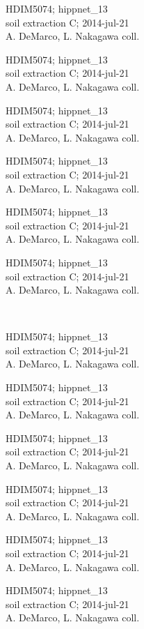 \documentclass[2pt]{extarticle}
\begin{document}
\noindent
\parbox{0.16\textwidth}{\tiny \raggedright \rule[-0.3\baselineskip]{0pt}{10pt}HDIM5074; hippnet\_13\\ soil extraction C; 2014-jul-21\\ A. DeMarco, L. Nakagawa coll.}
\parbox{0.16\textwidth}{\tiny \raggedright \rule[-0.3\baselineskip]{0pt}{10pt}HDIM5074; hippnet\_13\\ soil extraction C; 2014-jul-21\\ A. DeMarco, L. Nakagawa coll.}
\parbox{0.16\textwidth}{\tiny \raggedright \rule[-0.3\baselineskip]{0pt}{10pt}HDIM5074; hippnet\_13\\ soil extraction C; 2014-jul-21\\ A. DeMarco, L. Nakagawa coll.}
\parbox{0.16\textwidth}{\tiny \raggedright \rule[-0.3\baselineskip]{0pt}{10pt}HDIM5074; hippnet\_13\\ soil extraction C; 2014-jul-21\\ A. DeMarco, L. Nakagawa coll.}
\parbox{0.16\textwidth}{\tiny \raggedright \rule[-0.3\baselineskip]{0pt}{10pt}HDIM5074; hippnet\_13\\ soil extraction C; 2014-jul-21\\ A. DeMarco, L. Nakagawa coll.}
\parbox{0.16\textwidth}{\tiny \raggedright \rule[-0.3\baselineskip]{0pt}{10pt}HDIM5074; hippnet\_13\\ soil extraction C; 2014-jul-21\\ A. DeMarco, L. Nakagawa coll.} \\ 
\vspace{0.001in} 

\noindent
\parbox{0.16\textwidth}{\tiny \raggedright \rule[-0.3\baselineskip]{0pt}{10pt}HDIM5074; hippnet\_13\\ soil extraction C; 2014-jul-21\\ A. DeMarco, L. Nakagawa coll.}
\parbox{0.16\textwidth}{\tiny \raggedright \rule[-0.3\baselineskip]{0pt}{10pt}HDIM5074; hippnet\_13\\ soil extraction C; 2014-jul-21\\ A. DeMarco, L. Nakagawa coll.}
\parbox{0.16\textwidth}{\tiny \raggedright \rule[-0.3\baselineskip]{0pt}{10pt}HDIM5074; hippnet\_13\\ soil extraction C; 2014-jul-21\\ A. DeMarco, L. Nakagawa coll.}
\parbox{0.16\textwidth}{\tiny \raggedright \rule[-0.3\baselineskip]{0pt}{10pt}HDIM5074; hippnet\_13\\ soil extraction C; 2014-jul-21\\ A. DeMarco, L. Nakagawa coll.}
\parbox{0.16\textwidth}{\tiny \raggedright \rule[-0.3\baselineskip]{0pt}{10pt}HDIM5074; hippnet\_13\\ soil extraction C; 2014-jul-21\\ A. DeMarco, L. Nakagawa coll.}
\parbox{0.16\textwidth}{\tiny \raggedright \rule[-0.3\baselineskip]{0pt}{10pt}HDIM5074; hippnet\_13\\ soil extraction C; 2014-jul-21\\ A. DeMarco, L. Nakagawa coll.} \\ 
\vspace{0.001in} 
\end{document}

